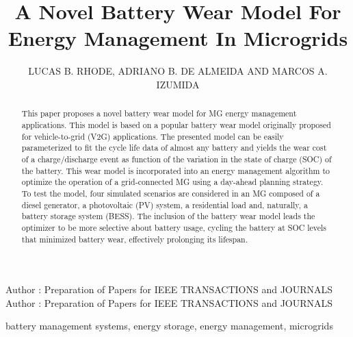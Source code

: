 \documentclass{ieeeaccess}
\begin{document}
    


    \title{A Novel Battery Wear Model For Energy Management In Microgrids}

    \author{
    	\uppercase{Lucas B. Rhode},
    	\uppercase{Adriano B. de Almeida}
    	\uppercase{and Marcos A. Izumida}
    }
    \address[1]{Sustainable Energies Center, CERTI Foundation, Brazil (e-mail: lrh@certi.org.br)}
    \address[2]{Western Parana State University, Brazil (e-mail: adriano.almeida@unioeste.br)}
    \address[3]{Sustainable Energies Center, CERTI Foundation, Brazil (e-mail: mlz@certi.org.br)}

    \markboth
    {Author \headeretal: Preparation of Papers for IEEE TRANSACTIONS and JOURNALS}
    {Author \headeretal: Preparation of Papers for IEEE TRANSACTIONS and JOURNALS}


    \begin{abstract}
        This paper proposes a novel battery wear model for \ac{MG} energy management applications. This model is based on a popular battery wear model originally proposed for vehicle-to-grid (V2G) applications. The presented model can be easily parameterized to fit the cycle life data of almost any battery and yields the wear cost of a charge/discharge event as function of the variation in the state of charge (SOC) of the battery. This wear model is incorporated into an energy management algorithm to optimize the operation of a grid-connected MG using a day-ahead planning strategy. To test the model, four simulated scenarios are considered in an MG composed of a diesel generator, a photovoltaic (PV) system, a residential load and, naturally, a battery storage system (BESS). The inclusion of the battery wear model leads the optimizer to be more selective about battery usage, cycling the battery at SOC levels that minimized battery wear, effectively prolonging its lifespan.
    \end{abstract}

    \begin{keywords}
        battery management systems, energy storage, energy management, microgrids
    \end{keywords}

    \titlepgskip=-15pt
\end{document}
